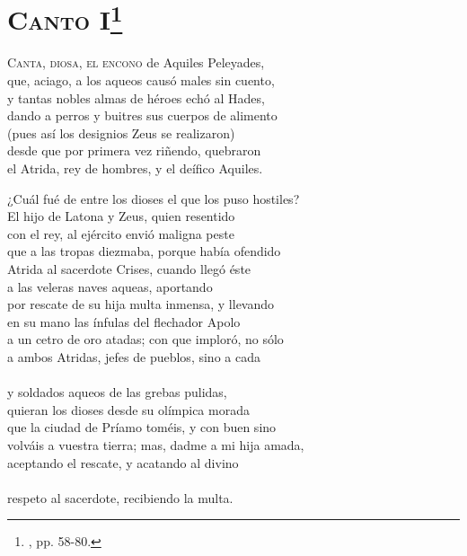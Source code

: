 \section*{\centering\textbf{\textsc{Canto} I}\footnote{\neh, pp. 58-80.}}
%
\beginnumbering
\pstart
\lettrine[lines=4, nindent=2pt]{C}{\textsc{anta, diosa, el encono}} de Aquiles Peleyades,\\
que, aciago, a los aqueos causó males sin cuento,\\
y tantas nobles almas de héroes echó al Hades,\\
dando a perros y buitres sus cuerpos de alimento\\
(pues así los designios Zeus se realizaron)\\
desde que por primera vez riñendo, quebraron\\
el Atrida, rey de hombres, y el deífico Aquiles.\par
¿Cuál fué de entre los dioses el que los puso hostiles?\\
El hijo de Latona y Zeus, quien resentido\\
con el rey, al ejército envió maligna peste\\
que a las tropas diezmaba, porque había ofendido\\
Atrida al sacerdote Crises, cuando llegó éste\\
a las veleras naves aqueas, aportando\\
por rescate de su hija multa inmensa, y llevando\\
en su mano las ínfulas del flechador Apolo\\
a un cetro de oro atadas; con que imploró, no sólo\\
a ambos Atridas, jefes de pueblos, sino a cada\\
\\
y soldados aqueos de las grebas pulidas,\\
quieran los dioses desde su olímpica morada\\
que la ciudad de Príamo toméis, y con buen sino\\
volváis a vuestra tierra; mas, dadme a mi hija amada,\\
aceptando el rescate, y acatando al divino\\
\\
respeto al sacerdote, recibiendo la multa.\\
